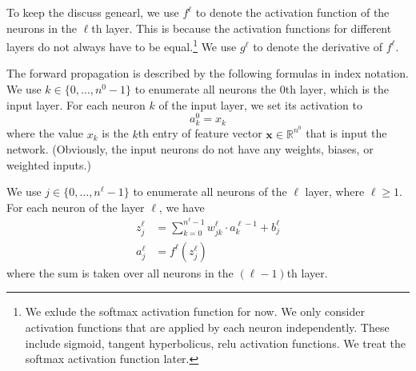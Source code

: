 \documentclass[12pt]{article}
\newcommand{\R}{\mathbb{R}}
\newcommand{\x}{\boldsymbol{x}}
\newcommand{\y}{\boldsymbol{y}}
\begin{document}
\medskip
\begin{center}
\end{center}

To keep the discuss genearl, we use $f^{\ell}$ to denote the activation function of the neurons in the $\ell$th layer. This is because the activation functions for different layers do not always have to be equal.\footnote{We exlude the softmax activation function for now. We only consider activation functions that are applied by each neuron independently. These include sigmoid, tangent hyperbolicus, relu activation functions. We treat the softmax activation function later.} We use $g^\ell$ to denote the derivative of $f^\ell$.

The forward propagation is described by the following formulas in index notation. We use $k\in\{0,\ldots,n^{0}-1\}$ to enumerate all neurons the $0$th layer, which is the input layer. For each neuron $k$ of the input layer, we set its activation to
\begin{equation}
  a^0_k = x_k
\end{equation}
where the value $x_k$ is the $k$th entry of feature vector $\x\in\R^{n^0}$ that is input the network. (Obviously, the input neurons do not have any weights, biases, or weighted inputs.)

We use $j\in\{0,\ldots,n^\ell-1\}$ to enumerate all neurons of the $\ell$ layer, where $\ell\ge 1$. For each neuron of the layer $\ell$, we have
\begin{align}
z^\ell_j &= \sum_{k=0}^{n^\ell-1} w^\ell_{jk} \cdot a^{\ell-1}_k + b^\ell_j \\
a^\ell_j &= f^\ell(z^\ell_j)
\end{align}
where the sum is taken over all neurons in the $(\ell-1)$th layer. 
\end{document}
